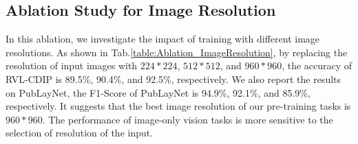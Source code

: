 \documentclass{article} %
\begin{document}
\begin{table}[ht]
\caption{Experimental results on XFUND-ZH. We re-implement $\rm LayoutXLM^*_{Base}$ with PaddleOCR to provide OCR results. The Normalized Edit Distance (1-NED) is used to evaluate for the end-to-end information extraction task.}
\label{chinese_ie}
\vspace{-0.5em}
\begin{center}
\end{center}
\vspace{-0.5em}
\end{table}


\subsection{Ablation Study for Image Resolution}
In this ablation, we investigate the impact of training with different image resolutions. As shown in Tab.\ref{table:Ablation_ImageResolution}, by replacing the resolution of input images with $224*224$, $512*512$, and $960*960$, the accuracy of RVL-CDIP is 89.5\%, 90.4\%, and 92.5\%, respectively. We also report the results on PubLayNet, the F1-Score of PubLayNet is 94.9\%, 92.1\%, and 85.9\%, respectively. It suggests that the best image resolution of our pre-training tasks is $960*960$. The performance of image-only vision tasks is more sensitive to the selection of resolution of the input.

\begin{table}[ht]
\caption{Ablation study for Different Image Resolution.}
\label{table:Ablation_ImageResolution}
\vspace{-0.5em}
\begin{center}
\end{center}
\vspace{-0.5em}
\end{table}
\end{document}
